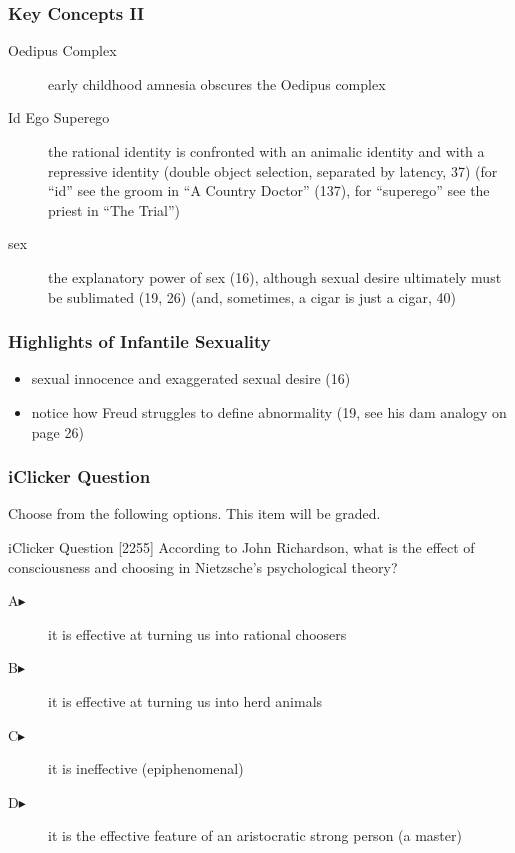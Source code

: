 \documentclass[xcolor=dvipsnames]{beamer}
\begin{document}
\begin{frame}
  \frametitle{Key Concepts II} 
  \begin{description}
  \item[Oedipus Complex] early childhood amnesia obscures the Oedipus
    complex
  \item[Id Ego Superego] the rational identity is confronted with an
    animalic identity and with a repressive identity (double object
    selection, separated by latency, 37) (for ``id'' see the groom in
    ``A Country Doctor'' (137), for ``superego'' see the priest in ``The
    Trial'')
  \item[sex] the explanatory power of sex (16), although sexual desire
    ultimately must be sublimated (19, 26) (and, sometimes, a cigar is
    just a cigar, 40)
  \end{description}
\end{frame}

\begin{frame}
  \frametitle{Highlights of Infantile Sexuality} 
  \begin{itemize}
  \item sexual innocence and exaggerated sexual desire (16)
  \item notice how Freud struggles to define abnormality (19, see his
    dam analogy on page 26)
  \end{itemize}
\end{frame}

\begin{frame}
  \frametitle{iClicker Question}
Choose from the following options. This item will be graded.
\begin{block}{iClicker Question}
[2255] According to John Richardson, what is the effect of
consciousness and choosing in Nietzsche's psychological theory?
\end{block}
\begin{description}
\item[A\hspace{.2in}$\blacktriangleright$] it is effective at turning us into rational choosers
\item[B\hspace{.2in}$\blacktriangleright$] it is effective at turning us into herd animals
\item[C\hspace{.2in}$\blacktriangleright$] it is ineffective (epiphenomenal)
\item[D\hspace{.2in}$\blacktriangleright$] it is the effective feature of an aristocratic strong person (a master)
\end{description}
\end{frame}
\end{document}
